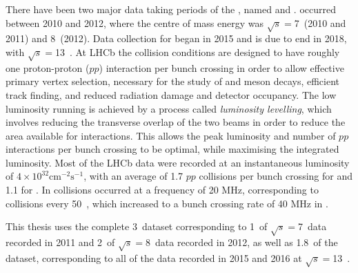 There have been two major data taking periods of the \lhc, named \runone and \runtwo. \runone occurred between 2010 and 2012, where the centre of mass energy was $\sqrt{s}=$7~\tev (2010 and 2011) and 8~\tev (2012). Data collection for \runtwo began in 2015 and is due to end in 2018, with $\sqrt{s}=$13~\tev. At LHCb the collision conditions are designed to have roughly one proton-proton ($pp$) interaction per bunch crossing in order to allow effective primary vertex selection, necessary for the study of \B and \D meson decays, efficient track finding, and reduced radiation damage and detector occupancy. The low luminosity running is achieved by a process called {\textit{luminosity levelling}}, which involves reducing the transverse overlap of the two beams in order to reduce the area available for interactions. This allows the peak luminosity and number of $pp$ interactions per bunch crossing to be optimal, while maximising the integrated luminosity. Most of the LHCb data were recorded at an instantaneous luminosity of $4 \times 10^{32}\text{cm}^{-2}\text{s}^{-1}$, with an average of 1.7 $pp$ collisions per bunch crossing for \runone and 1.1 for \runtwo. In \runone collisions occurred at a frequency of 20 MHz, corresponding to collisions every 50~\ns, which increased to a bunch crossing rate of 40 MHz in \runtwo.

This thesis uses the complete 3~\invfb \runone dataset corresponding to 1~\invfb of $\sqrt{s} = $7~\tev data recorded in 2011 and 2~\invfb of $\sqrt{s} = $8~\tev data recorded in 2012, as well as 1.8~\invfb of the \runtwo dataset, corresponding to all of the data recorded in 2015 and 2016 at $\sqrt{s}=$13~\tev.

